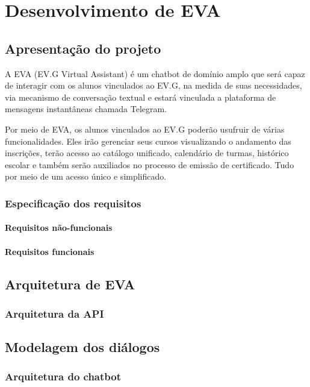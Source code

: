 \chapter{Desenvolvimento de EVA}

\section{Apresentação do projeto}

A EVA (EV.G Virtual Assistant) é um chatbot de domínio amplo que será capaz de interagir com os alunos vinculados ao EV.G, na medida de suas necessidades, via mecanismo de conversação textual e estará vinculada a plataforma de mensagens instantâneas chamada Telegram.

Por meio de EVA, os alunos vinculados ao EV.G poderão usufruir de várias funcionalidades. Eles irão gerenciar seus cursos visualizando o andamento das inscrições, terão acesso ao catálogo unificado, calendário de turmas, histórico escolar e também serão auxiliados no processo de emissão de certificado. Tudo por meio de um acesso único e simplificado.

\subsection{Especificação dos requisitos}

\subsubsection{Requisitos não-funcionais}

\subsubsection{Requisitos funcionais}

\section{Arquitetura de EVA}

\subsection{Arquitetura da API}

\section{Modelagem dos diálogos}

\subsection{Arquitetura do chatbot}